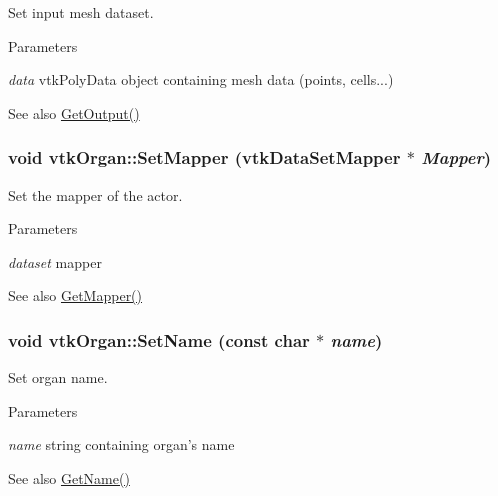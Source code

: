 Set input mesh dataset. 


\begin{DoxyParams}{Parameters}
\item[{\em data}]vtkPolyData object containing mesh data (points, cells...) \end{DoxyParams}
\begin{DoxySeeAlso}{See also}
\hyperlink{classvtkOrgan_a12141c47bba12d71e1b7d3c02d398f89}{GetOutput()} 
\end{DoxySeeAlso}
\hypertarget{classvtkOrgan_aefdce585f74966627c2b5c9d01be8fe3}{
\subsubsection[{SetMapper}]{\setlength{\rightskip}{0pt plus 5cm}void vtkOrgan::SetMapper (vtkDataSetMapper $\ast$ {\em Mapper})}}
\label{classvtkOrgan_aefdce585f74966627c2b5c9d01be8fe3}


Set the mapper of the actor. 


\begin{DoxyParams}{Parameters}
\item[{\em dataset}]mapper \end{DoxyParams}
\begin{DoxySeeAlso}{See also}
\hyperlink{classvtkOrgan_af638d5ed23ec53237ec15089ef5cbadc}{GetMapper()} 
\end{DoxySeeAlso}
\hypertarget{classvtkOrgan_a55ca17e15fea6a6c1672f8b271546e6b}{
\subsubsection[{SetName}]{\setlength{\rightskip}{0pt plus 5cm}void vtkOrgan::SetName (const char $\ast$ {\em name})}}
\label{classvtkOrgan_a55ca17e15fea6a6c1672f8b271546e6b}


Set organ name. 


\begin{DoxyParams}{Parameters}
\item[{\em name}]string containing organ's name \end{DoxyParams}
\begin{DoxySeeAlso}{See also}
\hyperlink{classvtkOrgan_a8421389b02b00b42b0899b75d00633b4}{GetName()} 
\end{DoxySeeAlso}


